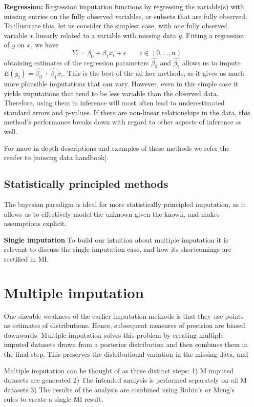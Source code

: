 \documentclass{article}
\begin{document}
	\textbf{Regression:}
	Regression imputation functions by regressing the variable(s) with missing entries on the fully observed variables, or subsets that are fully observed. To illustrate this, let us consider the simplest case, with one fully observed variable $x$ linearly related to a variable with missing data $y$. Fitting a regression of $y$ on $x$, we have$$Y_{i} = \beta_{0} + \beta_{1}x_{i} + \epsilon \qquad i\in(0,...,n)$$ obtaining estimates of the regression parameters $\hat{\beta_{0}}$ and $\hat{\beta_{1}}$ allows us to impute $E(y_{i}) = \hat{\beta_{0}} + \hat{\beta_{1}}x_{i}$. This is the best of the ad hoc methods, as it gives us much more plausible imputations that can vary. However, even in this simple case it yields imputations that tend to be less variable than the observed data. Therefore, using them in inference will most often lead to underestimated standard errors and p-values. If there are non-linear relationships in the data, this method's performance breaks down with regard to other aspects of inference as well.
	
	For more in depth descriptions and examples of these methods we refer the reader to [missing data handbook].
	
	\subsection{Statistically principled methods}
	The bayesian paradigm is ideal for more statistically principled imputation, as it allows us to effectively model the unknown given the known, and makes assumptions explicit.
	
	\textbf{Single imputation}
	To build our intuition about multiple imputation it is relevant to discuss the single imputation case, and how its shortcomings are rectified in MI.
	
	\section{Multiple imputation}
	One sizeable weakness of the earlier imputation methods is that they use points as estimates of distributions. Hence, subsequent measures of precision are biased downwards. Multiple imputation solves this problem by creating multiple imputed datasets drawn from a posterior distribution and then combines them in the final step. This preserves the distributional variation in the missing data, and 

	Multiple imputation can be thought of as three distinct steps:
	1) M imputed datasets are generated
	2) The intended analysis is performed separately on all M datasets
	3) The results of the analysis are combined using Rubin's or Meng's rules to create a single MI result.
	
\end{document}
